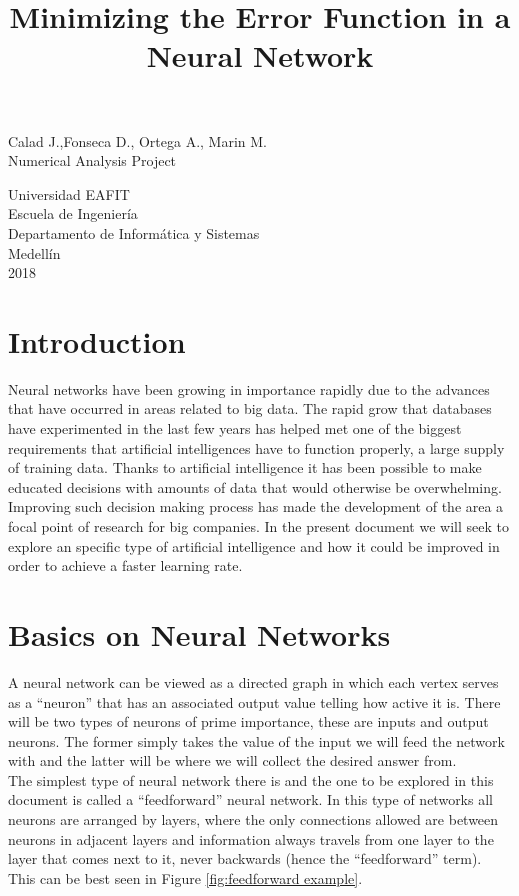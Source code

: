 \documentclass[a4paper, 12pt]{amsart}
\begin{document}
\title{Minimizing the Error Function in a Neural Network}

\clearpage
\maketitle
\thispagestyle{empty}

\vfill
\hfill
\begin{center}
Calad J.,Fonseca D., Ortega A., Marin M.\\
Numerical Analysis Project
\end{center}
\vfill
\hfill

\begin{center}
Universidad EAFIT\\
Escuela de Ingeniería\\
Departamento de Informática y Sistemas\\
Medellín\\
2018
\end{center}
\clearpage

\tableofcontents
\clearpage
\section{Introduction}
Neural networks have been growing in importance rapidly due to the advances
that have occurred in areas related to big data. The rapid grow that databases have
experimented in the last few years has helped met one of the biggest requirements 
that artificial intelligences have to function properly, a large supply of training 
data. Thanks to artificial intelligence it has been possible to make educated
decisions with amounts of data that would otherwise be overwhelming. Improving such
decision making process has made the development of the area a focal point of
research for big companies. In the present document we will seek to explore an
specific type of artificial intelligence and how it could be improved in order
to achieve a faster learning rate.
\section{Basics on Neural Networks}
A neural network can be viewed as a directed graph in which each vertex serves
as a ``neuron'' that has an associated output value telling how active it is.
There will be two types of neurons of prime importance, these are inputs and
output neurons. The former simply takes the value of the input we will feed the
network with and the latter will be where we will collect the desired answer
from.\\
The simplest type of neural network there is and the one to be explored
in this document is called  a ``feedforward'' neural network. In this type of
networks all neurons are arranged by layers, where the only connections allowed
are between neurons in adjacent layers and information always travels from one
layer to the layer that comes next to it, never backwards (hence the
``feedforward'' term). This can be best seen in Figure
\ref{fig:feedforward example}.
\end{document}
